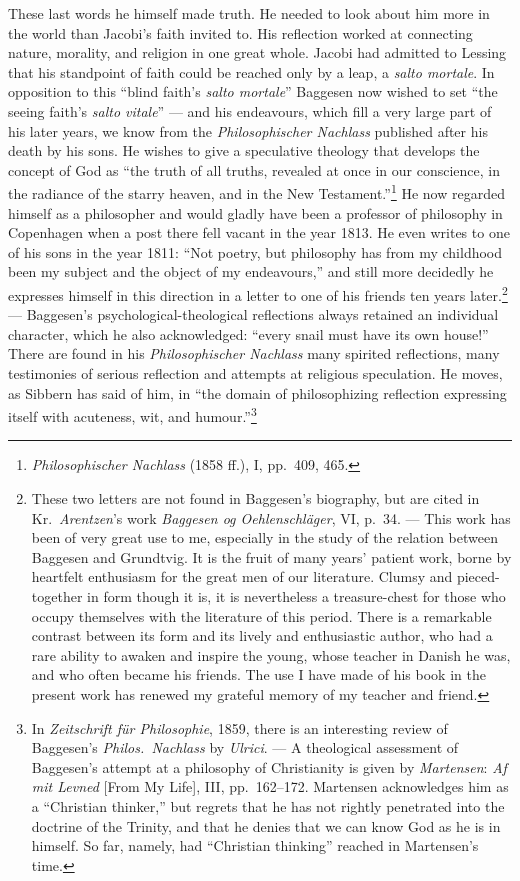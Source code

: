 \documentclass[12pt,a4paper]{book}
\newcommand{\opage}[1]{\marginnote{\footnotesize\textit{[#1]}}}
\begin{document}
These last words he himself made truth. He needed to look about him more in the world
than Jacobi's faith invited to. His reflection worked at connecting nature, morality,
and religion in one great whole. Jacobi had admitted to Lessing that his standpoint of
faith could be reached only by a leap, a \emph{salto mortale}. In opposition to this
``blind faith's \emph{salto mortale}'' Baggesen now wished to set ``the seeing faith's
\emph{salto vitale}'' --- and his endeavours, which fill a very large part of his
later years, we know from the \emph{Philosophischer Nachlass} published after his
death by his sons. He wishes to give a speculative theology that develops the concept
of God as ``the truth of all truths, revealed at once in our conscience, in the
radiance of the starry heaven, and in the New Testament.''\footnote{\emph{Philosophischer
Nachlass} (1858 ff.), I, pp.~409, 465.} He now regarded himself as a philosopher and
would gladly have been a professor of philosophy in Copenhagen when a post there fell
vacant in the year 1813. He even writes to one of his sons in the year 1811: ``Not
poetry, but philosophy has from my childhood been my subject and the object of my
endeavours,'' and still more decidedly he expresses himself in this direction in a
letter to one of his friends ten years later.\footnote{These two letters are not found
in Baggesen's biography, but are cited in Kr.\ \emph{Arentzen}'s work \emph{Baggesen og
Oehlenschläger}, VI, p.~34. --- This work has been of very great use to me, especially
in the study of the relation between Baggesen and Grundtvig. It is the fruit of many
years' patient work, borne by heartfelt enthusiasm for the great men of our
literature. Clumsy and pieced-together in form though it is, it is nevertheless a
treasure-chest for those who occupy themselves with the literature of this period.
There is a remarkable contrast between its form and its lively and enthusiastic
author, who had a rare ability to awaken and inspire the young, whose teacher in
Danish he was, and who often became his friends. The use I have made of his book in the
present work has renewed my grateful memory of my teacher and friend.} --- Baggesen's
\opage{68}psychological-theological reflections always retained an individual character, which he
also acknowledged: ``every snail must have its own house!'' There are found in his
\emph{Philosophischer Nachlass} many spirited reflections, many testimonies of serious
reflection and attempts at religious speculation. He moves, as Sibbern has said of him,
in ``the domain of philosophizing reflection expressing itself with acuteness, wit, and
humour.''\footnote{In \emph{Zeitschrift für Philosophie}, 1859, there is an interesting
review of Baggesen's \emph{Philos.\ Nachlass} by \emph{Ulrici}. --- A theological assessment
of Baggesen's attempt at a philosophy of Christianity is given by \emph{Martensen}: \emph{Af
mit Levned} [From My Life], III, pp.~162--172. Martensen acknowledges him as a
``Christian thinker,'' but regrets that he has not rightly penetrated into the doctrine
of the Trinity, and that he denies that we can know God as he is in himself. So far,
namely, had ``Christian thinking'' reached in Martensen's time.}
\end{document}
